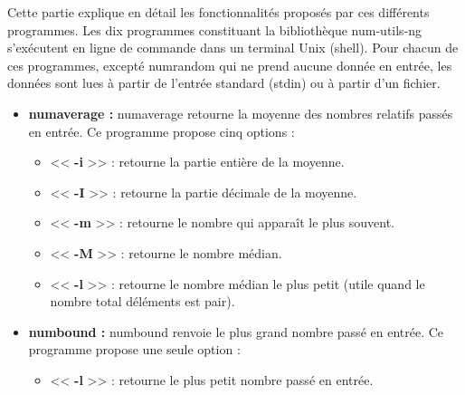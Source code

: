 Cette partie explique en d\'etail les fonctionnalit\'es propos\'es par ces diff\'erents programmes.
Les dix programmes constituant la biblioth\`eque num-utils-ng s'ex\'ecutent en ligne de commande dans un terminal Unix (shell).
Pour chacun de ces programmes, except\'e numrandom qui ne prend aucune donn\'ee en entr\'ee, les donn\'ees sont lues \`a partir 
de l'entr\'ee standard (stdin) ou \`a partir d'un fichier.
\newline
\begin{itemize}
 \item[\textbullet] \textbf{numaverage :} numaverage retourne la moyenne des nombres relatifs pass\'es en entr\'ee.
Ce programme propose cinq options :
\begin{itemize}
  \item << \textbf{-i} >> : retourne la partie enti\`ere de la moyenne.
  \item << \textbf{-I} >> : retourne la partie d\'ecimale de la moyenne.
  \item << \textbf{-m} >> : retourne le nombre qui appara\^it le plus souvent.
  \item << \textbf{-M} >> : retourne le nombre m\'edian.
  \item << \textbf{-l} >> : retourne le nombre m\'edian le plus petit (utile quand le nombre total d\'el\'ements est pair).
\newline
\end{itemize}

 \item[\textbullet] \textbf{numbound :} numbound renvoie le plus grand nombre pass\'e en entr\'ee.
Ce programme propose une seule option :
\begin{itemize}
  \item << \textbf{-l} >> : retourne le plus petit nombre pass\'e en entr\'ee.
\newline
\end{itemize}


\end{itemize}
